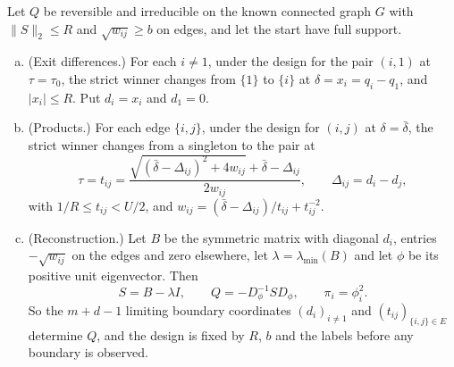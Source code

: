 \begin{theorem}\label{thm:reversible-reconstruction}
Let $Q$ be reversible and irreducible on the known connected graph $G$ with
$\|S\|_2\le R$ and $\sqrt{w_{ij}}\ge b$ on edges, and let the start have full
support.
\begin{enumerate}[(a)]
\item (Exit differences.) For each $i\ne1$, under the design for the pair
$(i,1)$ at $\tau=\tau_0$, the strict winner changes from $\{1\}$ to $\{i\}$ at
$\delta=x_i=q_i-q_1$, and $|x_i|\le R$. Put $d_i=x_i$ and $d_1=0$.
\item (Products.) For each edge $\{i,j\}$, under the design for $(i,j)$ at
$\delta=\bar\delta$, the strict winner changes from a singleton to the pair at
\[
 \tau=t_{ij}=\frac{\sqrt{(\bar\delta-\Delta_{ij})^2+4w_{ij}}+\bar\delta-\Delta_{ij}}{2w_{ij}},\qquad
 \Delta_{ij}=d_i-d_j,
\]
with $1/R\le t_{ij}<U/2$, and $w_{ij}=(\bar\delta-\Delta_{ij})/t_{ij}+t_{ij}^{-2}$.
\item (Reconstruction.) Let $B$ be the symmetric matrix with diagonal $d_i$,
entries $-\sqrt{w_{ij}}$ on the edges and zero elsewhere, let
$\lambda=\lambda_{\min}(B)$ and let $\phi$ be its positive unit eigenvector. Then
\[
 S=B-\lambda I,\qquad Q=-D_\phi^{-1}SD_\phi,\qquad \pi_i=\phi_i^2 .
\]
So the $m+d-1$ limiting boundary coordinates $(d_i)_{i\ne1}$ and
$(t_{ij})_{\{i,j\}\in E}$ determine $Q$, and the design is fixed by $R$, $b$ and
the labels before any boundary is observed.
\end{enumerate}
\end{theorem}

